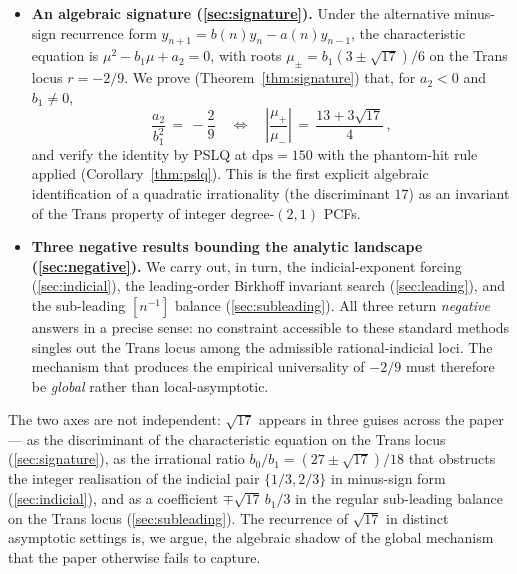 \documentclass[11pt]{amsart}
\theoremstyle{definition}
\theoremstyle{remark}
\newcommand{\dps}{\mathrm{dps}}
\begin{document}
\begin{itemize}[leftmargin=1.4em]
\item \textbf{An algebraic signature
(\textsection\ref{sec:signature}).}  Under the alternative
minus-sign recurrence form
$y_{n+1} = b(n)y_n - a(n)y_{n-1}$, the
characteristic equation is $\mu^2 - b_1\mu + a_2 = 0$, with roots
$\mu_\pm = b_1(3\pm\sqrt{17})/6$ on the Trans locus $r=-2/9$.  We
prove (Theorem~\ref{thm:signature}) that, for $a_2<0$ and
$b_1\ne 0$,
\[
  \frac{a_2}{b_1^2} \,=\, -\frac{2}{9}
  \quad\Longleftrightarrow\quad
  \left|\frac{\mu_+}{\mu_-}\right| \,=\, \frac{13 + 3\sqrt{17}}{4}\,,
\]
and verify the identity by PSLQ at $\dps = 150$ with the phantom-hit
rule applied (Corollary~\ref{thm:pslq}).  This is the first explicit
algebraic identification of a quadratic irrationality (the discriminant
$17$) as an invariant of the Trans property of integer
degree-$(2,1)$ PCFs.
\item \textbf{Three negative results bounding the analytic landscape
(\textsection\ref{sec:negative}).}  We carry out, in turn, the
indicial-exponent forcing (\textsection\ref{sec:indicial}), the
leading-order Birkhoff invariant search
(\textsection\ref{sec:leading}), and the sub-leading $[n^{-1}]$
balance (\textsection\ref{sec:subleading}).  All three return
\emph{negative} answers in a precise sense: no constraint accessible
to these standard methods singles out the Trans locus among the
admissible rational-indicial loci.  The mechanism that produces the
empirical universality of $-2/9$ must therefore be \emph{global}
rather than local-asymptotic.
\end{itemize}

The two axes are not independent: $\sqrt{17}$ appears in three guises
across the paper --- as the discriminant of the characteristic
equation on the Trans locus
(\textsection\ref{sec:signature}), as the irrational ratio
$b_0/b_1=(27\pm\sqrt{17})/18$ that obstructs the integer realisation
of the indicial pair $\{1/3,2/3\}$ in minus-sign form
(\textsection\ref{sec:indicial}), and as a coefficient
$\mp\sqrt{17}\,b_1/3$ in the regular sub-leading balance on the Trans
locus (\textsection\ref{sec:subleading}).  The recurrence of
$\sqrt{17}$ in distinct asymptotic settings is, we argue, the
algebraic shadow of the global mechanism that the paper otherwise
fails to capture.
\end{document}
